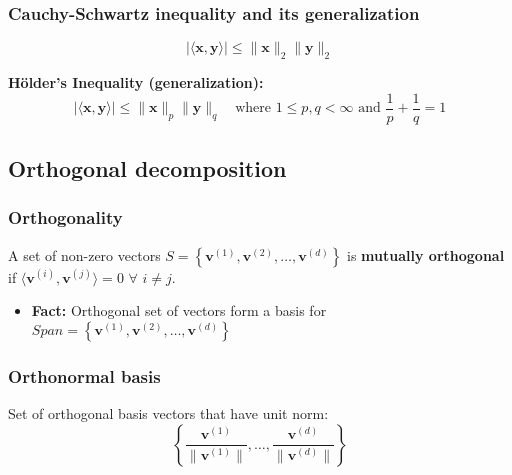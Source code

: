 \subsubsection{Cauchy-Schwartz inequality and its generalization}
\begin{definition}
        \begin{equation}
            | \langle \mathbf{x}, \mathbf{y} \rangle | \leq \|\mathbf{x}\|_2 \|\mathbf{y}\|_2    
        \end{equation}
        \vspace{1em}

        \textbf{Hölder's Inequality (generalization):}
        \begin{equation}
            | \langle \mathbf{x}, \mathbf{y} \rangle | \leq \|\mathbf{x}\|_p \|\mathbf{y}\|_q \quad \text{where } 1 \leq p, q < \infty \text{ and } \frac{1}{p} + \frac{1}{q} = 1
        \end{equation}
\end{definition}

\subsection{Orthogonal decomposition}
\subsubsection{Orthogonality}
\begin{definition}
    A set of non-zero vectors \( S = \left\{ \mathbf{v}^{(1)}, \mathbf{v}^{(2)}, \ldots, \mathbf{v}^{(d)} \right\} \) is \textbf{mutually orthogonal} if \( \langle \mathbf{v}^{(i)}, \mathbf{v}^{(j)} \rangle = 0 \) $\forall$ \( i \neq j \).
    \begin{itemize}
        \item \textbf{Fact:} Orthogonal set of vectors form a basis for \( Span = \left\{ \mathbf{v}^{(1)}, \mathbf{v}^{(2)}, \ldots, \mathbf{v}^{(d)} \right\} \)
    \end{itemize}
\end{definition}

\subsubsection{Orthonormal basis}
\begin{definition}
    Set of orthogonal basis vectors that have unit norm:
    \[
    \left\{ \frac{\mathbf{v}^{(1)}}{\|\mathbf{v}^{(1)}\|}, \ldots, \frac{\mathbf{v}^{(d)}}{\|\mathbf{v}^{(d)}\|} \right\}
    \]
\end{definition}

